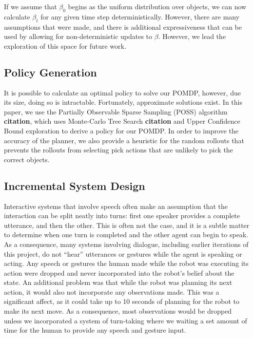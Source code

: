 \documentclass{article}
\begin{document}
If we assume that $\beta_0$ begins as the uniform distribution over objects, we can now calculate $\beta_t$ for any given time step deterministically. However, there are many assumptions that were made, and there is additional expressiveness that can be used by allowing for non-deterministic updates to $\beta$. However, we lead the exploration of this space for future work. 

\subsection{Policy Generation}

It is possible to calculate an optimal policy to solve our POMDP, however, due its size, doing so is intractable. Fortunately, approximate solutions exist. In this paper, we use the Partially Observable Sparse Sampling (POSS) algorithm \textbf{citation}, which uses Monte-Carlo Tree Search \textbf{citation} and Upper Confidence Bound exploration to derive a policy for our POMDP. In order to improve the accuracy of the planner, we also provide a heuristic for the random rollouts that prevents the rollouts from selecting pick actions that are unlikely to pick the correct objects. 


\subsection{Incremental System Design}

Interactive systems that involve speech often make an assumption that the interaction can be split neatly into turns: first one speaker provides a complete utterance, and then the other. This is often not the case, and it is a subtle matter to determine when one turn is completed and the other agent can begin to speak. As a consequence, many systems involving dialogue, including earlier iterations of this project, do not ``hear'' utterances or gestures while the agent is speaking or acting. Any speech or gestures the human made while the robot was executing its action were dropped and never incorporated into the robot's belief about the state. An additional problem was that while the robot was planning its next action, it would also not incorporate any observations made. This was a significant affect, as it could take up to 10 seconds of planning for the robot to make its next move. As a consequence, most observations would be dropped unless we incorporated a system of turn-taking where we waiting a set amount of time for the human to provide any speech and gesture input. 
\end{document}
